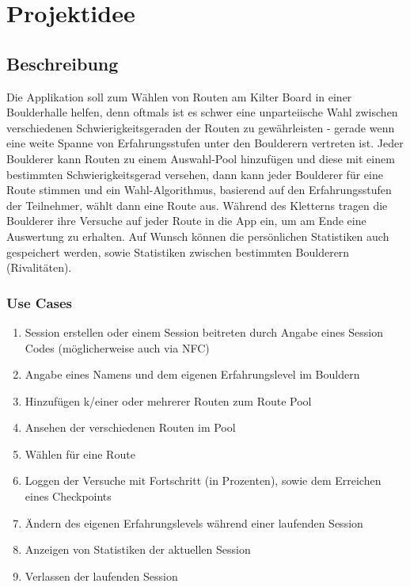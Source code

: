 \documentclass[11pt,a4paper,headsepline,footsepline,bibliography=totocnumbered]{article}
\begin{document}
\pagebreak
\tableofcontents

\newpage

\section{Projektidee}

  \subsection{Beschreibung}
    \par
      Die Applikation soll zum Wählen von Routen am Kilter Board in einer Boulderhalle helfen,
      denn oftmals ist es schwer eine unparteiische Wahl zwischen verschiedenen Schwierigkeitsgeraden der Routen zu gewährleisten -
      gerade wenn eine weite Spanne von Erfahrungsstufen unter den Boulderern vertreten ist.
      Jeder Boulderer kann Routen zu einem Auswahl-Pool hinzufügen und diese mit einem bestimmten Schwierigkeitsgerad versehen,
      dann kann jeder Boulderer für eine Route stimmen und ein Wahl-Algorithmus, basierend auf den Erfahrungsstufen der Teilnehmer, wählt dann eine Route aus.
      Während des Kletterns tragen die Boulderer ihre Versuche auf jeder Route in die App ein, um am Ende eine Auswertung zu erhalten.
      Auf Wunsch können die persönlichen Statistiken auch gespeichert werden, sowie Statistiken zwischen bestimmten Boulderern (Rivalitäten).

    \subsubsection{Use Cases}
      \begin{enumerate}
        \item Session erstellen oder einem Session beitreten durch Angabe eines Session Codes (möglicherweise auch via NFC)
        \item Angabe eines Namens und dem eigenen Erfahrungslevel im Bouldern
        \item Hinzufügen k/einer oder mehrerer Routen zum Route Pool
        \item Ansehen der verschiedenen Routen im Pool
        \item Wählen für eine Route
        \item Loggen der Versuche mit Fortschritt (in Prozenten), sowie dem Erreichen eines Checkpoints
        \item Ändern des eigenen Erfahrungslevels während einer laufenden Session
        \item Anzeigen von Statistiken der aktuellen Session
        \item Verlassen der laufenden Session
      \end{enumerate}
\end{document}
